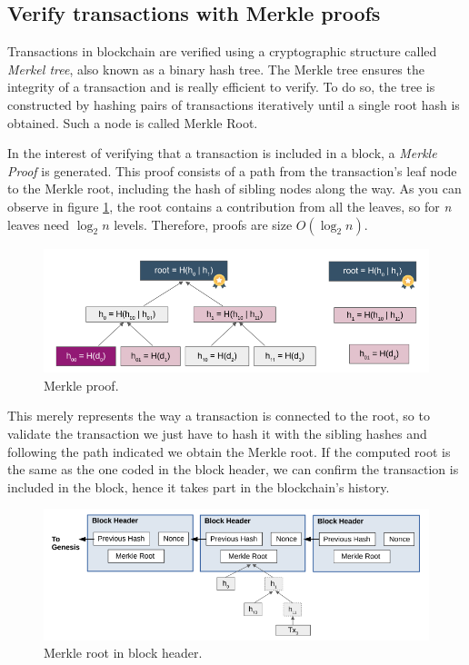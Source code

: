 \documentclass[a4paper,12pt]{article}
\begin{document}
\begin{appendices}
{}

\section{Verify transactions with Merkle proofs}
\label{appendix:merkle-tree}
{Transactions in blockchain are verified using a cryptographic structure called \textit{Merkel tree}, also known as a binary hash tree. The Merkle tree ensures the integrity of a transaction and is really efficient to verify. To do so, the tree is constructed by hashing pairs of transactions iteratively until a single root hash is obtained. Such a node is called Merkle Root.

In the interest of verifying that a transaction is included in a block, a \textit{Merkle Proof} is generated. This proof consists of a path from the transaction's leaf node to the Merkle root, including the hash of sibling nodes along the way. As you can observe in figure \ref{fig:merkle-proof}, the root contains a contribution from all the leaves, so for \textit{n} leaves need $\log_2 n$ levels. Therefore, proofs are size $O(\log_2 n)$.

\begin{figure}[H]
\centering
\includegraphics[width=14cm]{img/chapter_2/merkle_proof.png}
\caption[Merkle proof]{\footnotesize{Merkle proof.}}
\label{fig:merkle-proof}
\end{figure}

This merely represents the way a transaction is connected to the root, so to validate the transaction we just have to hash it with the sibling hashes and following the path indicated we obtain the Merkle root. If the computed root is the same as the one coded in the block header, we can confirm the transaction is included in the block, hence it takes part in the blockchain's history.

\begin{figure}[H]
\centering
\includegraphics[width=14cm]{img/chapter_2/merkle_verification.png}
\caption[Merkle root]{\footnotesize{Merkle root in block header.}}
\label{fig:merkle-root-block-header}
\end{figure}

}
\end{appendices}
\end{document}
